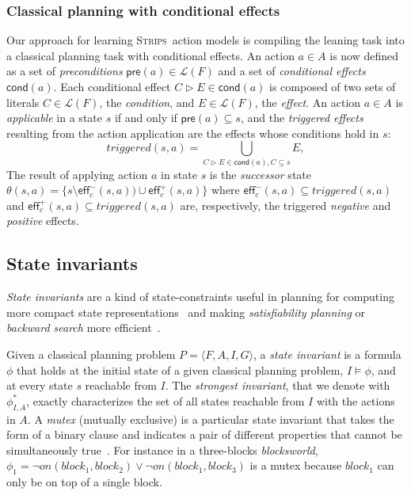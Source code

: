 \documentclass{article}
\newcommand{\tup}[1]{{\langle #1 \rangle}}
\newcommand{\pre}{\mathsf{pre}}     %
\newcommand{\eff}{\mathsf{eff}}     %
\newcommand{\cond}{\mathsf{cond}}   %
\newcommand{\strips}{\textsc{Strips}}     %
\begin{document}
\subsubsection{Classical planning with conditional effects}
Our approach for learning \strips\ action models is compiling the leaning task into a classical planning task with conditional effects. An action $a\in A$ is now defined as a set of {\em preconditions} $\pre(a)\in\mathcal{L}(F)$ and a set of {\em conditional effects} $\cond(a)$. Each conditional effect $C\rhd E\in\cond(a)$ is composed of two sets of literals $C\in\mathcal{L}(F)$, the {\em condition}, and $E\in\mathcal{L}(F)$, the {\em effect}. An action $a\in A$ is {\em applicable} in a state $s$ if and only if $\pre(a)\subseteq s$, and the {\em triggered effects} resulting from the action application are the effects whose conditions hold in $s$:
\[
triggered(s,a)=\bigcup_{C\rhd E\in\cond(a),C\subseteq s} E,
\]
The result of applying action $a$ in state $s$ is the {\em successor} state $\theta(s,a)=\{s\setminus\eff_c^-(s,a))\cup\eff_c^+(s,a)\}$ where $\eff_c^-(s,a)\subseteq triggered(s,a)$ and $\eff_c^+(s,a)\subseteq triggered(s,a)$ are, respectively, the triggered {\em negative} and {\em positive} effects.


\subsection{State invariants}
{\em State invariants} are a kind of state-constraints useful in planning for computing more compact state representations~\cite{helmert2009concise} and making {\em satisfiability planning} or {\em backward search} more efficient~\cite{rintanen2014madagascar,alcazar2015reminder}.

Given a classical planning problem $P=\tup{F,A,I,G}$, a {\em state invariant} is a formula $\phi$ that holds at the initial state of a given classical planning problem, $I\models \phi$, and at every state $s$ reachable from $I$. The {\em strongest invariant}, that we denote with $\phi_{I,A}^*$, exactly characterizes the set of all states reachable from $I$ with the actions in $A$. A {\em mutex} (mutually exclusive) is a particular state invariant that takes the form of a binary clause and indicates a pair of different properties that cannot be simultaneously true~\cite{kautz:mutex:IJCAI1999}. For instance in a three-blocks {\em blocksworld}, $\phi_1=\neg on(block_1,block_2)\vee \neg on(block_1,block_3)$ is a mutex because $block_1$ can only be on top of a single block. 
\end{document}
